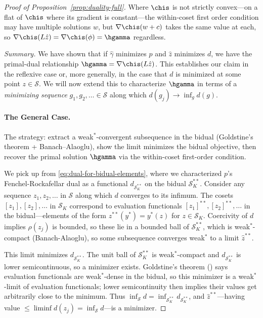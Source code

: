 \documentclass{article}
\newcommand{\calS}{\mathcal{S}}
\begin{document}
\begin{proof}[Proof of
Proposition~\ref{prop:duality-full}]
Where $\chis$ is not strictly convex---on a flat of $\chis$ where its gradient is constant---the within-coset first order condition may have multiple solutions $w$, but $\nabla\chis(w + c)$ takes the same value at each, so $\nabla\chis(L\hat z) = \nabla\chis(\phi) = \hgamma$ regardless.

\textit{Summary.}
We have shown that if $\hat\gamma$ minimizes $p$ and $\hat z$ minimizes $d$, we have the primal-dual relationship $\hgamma = \nabla \chis(L\hat z)$. This establishes our claim in the reflexive case or, more generally, in the case that $d$ is minimized at some point $z \in \calS$. We will now extend this to characterize $\hgamma$ in terms of a \emph{minimizing sequence}
$g_1,g_2,\ldots \in \calS$ along which $d(g_j) \to \inf_{g}d(g)$.

\paragraph{The General Case.}
The strategy:
extract a weak$^*$-convergent subsequence
in the bidual
(Goldstine's theorem + Banach--Alaoglu),
show the limit minimizes the bidual objective,
then recover the primal solution $\hgamma$
via the within-coset first-order condition.

We pick up from \eqref{eq:dual-for-bidual-elements}, where we characterized $p$'s Fenchel-Rockafellar dual as a functional $d_{\calS_K^{**}}$ on the bidual $\calS_K^{**}$. Consider any sequence $z_1,z_2,\ldots$ in $\calS$ along which $d$ converges to its infimum. The cosets $[z_1], [z_2], \ldots$ in $\calS_K$ correspond to evaluation functionals $[z_1]^{**}, [z_2]^{**}, \ldots$ in the bidual---elements of the form $z^{**}(y^*) = y^*(z)$ for $z \in \calS_K$. Coercivity of $d$ implies $\rho(z_j)$ is bounded, so these lie in a bounded ball of $\calS_K^{**}$, which is weak$^*$-compact (Banach-Alaoglu), so some subsequence converges weak$^*$ to a limit $\hat z^{**}$.

This limit minimizes $d_{\calS_K^{**}}$. The unit ball of $\calS_K^{**}$ is weak$^*$-compact and $d_{\calS_K^{**}}$ is lower semicontinuous, so a minimizer exists. Goldstine's theorem () says evaluation functionals are weak$^*$-dense in the bidual, so this minimizer is a weak$^*$-limit of evaluation functionals; lower semicontinuity then implies their values get arbitrarily close to the minimum. Thus $\inf_\calS d = \inf_{\calS_K^{**}} d_{\calS_K^{**}}$, and $\hat z^{**}$---having value $\le \liminf d(z_j) = \inf_\calS d$---is a minimizer.


\end{proof}
\end{document}
